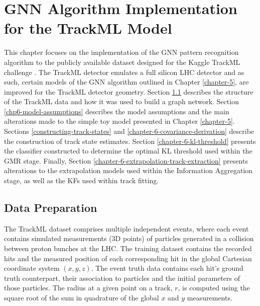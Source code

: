 


\chapter{GNN Algorithm Implementation for the TrackML Model}
\label{chapter-6}

This chapter focuses on the implementation of the GNN pattern recognition algorithm to the publicly available dataset designed for the Kaggle TrackML challenge \cite{kaggle-trackml}. The TrackML detector emulates a full silicon LHC detector and as such, certain models of the GNN algorithm outlined in Chapter \ref{chapter-5}, are improved for the TrackML detector geometry. Section \ref{chapter-6-data-prep} describes the structure of the TrackML data and how it was used to build a graph network. Section \ref{chp6-model-assumptions} describes the model assumptions and the main alterations made to the simple toy model presented in Chapter \ref{chapter-5}. Sections \ref{constructing-track-states} and \ref{chapter-6-covariance-derivation} describe the construction of track state estimates. Section \ref{chapter-6-kl-threshold} presents the classifier constructed to determine the optimal KL threshold used within the GMR stage. Finally, Section \ref{chapter-6-extrapolation-track-extraction} presents alterations to the extrapolation models used within the Information Aggregation stage, as well as the KFs used within track fitting. 
 


\section{Data Preparation}
\label{chapter-6-data-prep}

The TrackML dataset \cite{kaggle-trackml-data} comprises multiple independent events, where each event contains simulated measurements (3D points) of particles generated in a collision between proton bunches at the LHC. The training dataset contains the recorded hits and the measured position of each corresponding hit in the global Cartesian coordinate system $(x, y, z)$. The event truth data contains each hit's ground truth counterpart, their association to particles and the initial parameters of those particles. The radius at a given point on a track, $r$, is computed using the square root of the sum in quadrature of the global $x$ and $y$ measurements.

